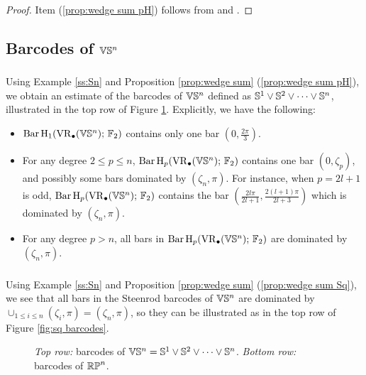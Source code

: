 \begin{proof}
	Item (\ref{prop:wedge sum pH}) follows from \cite[Proposition 3.7]{adamaszek2020homotopy} and \cite[Thoerem 9 (2)]{lim2020vietoris}.
	
\end{proof}

\subsection{Barcodes of $\mathbb{V}\mathbb{S}^n$}

\subsubsection{} Using Example \ref{ss:Sn} and Proposition \ref{prop:wedge sum} (\ref{prop:wedge sum pH}), we obtain an estimate of the barcodes of $\mathbb{V}\mathbb{S}^n$ defined as $\mathbb{S}^1 \vee \mathbb{S}^2 \vee \dots \vee \mathbb{S}^n$, illustrated in the top row of Figure \ref{fig:barcodes}.
Explicitly, we have the following:
\begin{itemize}
	\item $\operatorname{Bar} \operatorname{H}_{1}(\operatorname{VR}_\bullet(\mathbb{V}\mathbb{S}^n);\,{\mathbb{F}_2})$ contains only one bar $(0,\frac{2\pi}{3})$.
	\item For any degree $2\leq p\leq n$, $\operatorname{Bar} \operatorname{H}_{p}(\operatorname{VR}_\bullet(\mathbb{V}\mathbb{S}^n);\,{\mathbb{F}_2})$ contains one bar $(0,\zeta_p)$, and possibly some bars dominated by $(\zeta_n,\pi)$.
	For instance, when $p=2l+1$ is odd, $\operatorname{Bar} \operatorname{H}_{p}(\operatorname{VR}_\bullet(\mathbb{V}\mathbb{S}^n);\,{\mathbb{F}_2})$ contains the bar $( \frac{2l\pi}{2l+1},\frac{2(l+1)\pi}{2l+3})$ which is dominated by $(\zeta_n,\pi)$.
	\item For any degree $p>n$, all bars in $\operatorname{Bar} \operatorname{H}_{p}(\operatorname{VR}_\bullet(\mathbb{V}\mathbb{S}^n);\,{\mathbb{F}_2})$ are dominated by $(\zeta_n,\pi)$.
\end{itemize}

\subsubsection{} Using Example \ref{ss:Sn} and Proposition \ref{prop:wedge sum} (\ref{prop:wedge sum Sq}), we see that all bars in the Steenrod barcodes of $\mathbb{V}\mathbb{S}^n$ are dominated by $\cup_{1\leq i\leq n}(\zeta_i,\pi)=(\zeta_n,\pi)$, so they can be illustrated as in the top row of Figure \ref{fig:sq barcodes}.

\begin{figure}
	\centering
	
	\caption{\emph{Top row:} barcodes of $\mathbb{V}\mathbb{S}^n = \mathbb{S}^1 \vee \mathbb{S}^2 \vee \dots \vee \mathbb{S}^n$. \emph{Bottom row:} barcodes of $\mathbb{RP}^n$.}
	\label{fig:barcodes}
\end{figure}

